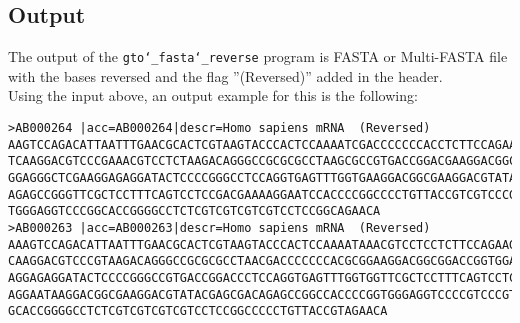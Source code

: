 \subsection*{Output}
The output of the \texttt{gto\char`_fasta\char`_reverse} program is FASTA or Multi-FASTA file with the bases reversed and the flag ''(Reversed)'' added in the header.\\
Using the input above, an output example for this is the following:
\begin{lstlisting}
>AB000264 |acc=AB000264|descr=Homo sapiens mRNA  (Reversed)
AAGTCCAGACATTAATTTGAACGCACTCGTAAGTACCCACTCCAAAATCGACCCCCCCACCTCTTCCAGAAGGTCTTCT
TCAAGGACGTCCCGAAACGTCCTCTAAGACAGGGCCGCGCGCCTAAGCGCCGTGACCGGACGAAGGACGGCGGACCGGT
GGAGGGCTCGAAGGAGAGGATACTCCCCGGGCCTCCAGGTGAGTTTGGTGAAGGACGGCGAAGGACGTATACGAGCGAC
AGAGCCGGGTTCGCTCCTTTCAGTCCTCCGACGAAAAGGAATCCACCCCGGCCCCTGTTACCGTCGTCCCGTCGCCACC
TGGGAGGTCCCGGCACCGGGGCCTCTCGTCGTCGTCGTCCTCCGGCAGAACA
>AB000263 |acc=AB000263|descr=Homo sapiens mRNA  (Reversed)
AAAGTCCAGACATTAATTTGAACGCACTCGTAAGTACCCACTCCAAAATAAACGTCCTCCTCTTCCAGAAGGTCTTCTT
CAAGGACGTCCCGTAAGACAGGGCCGCGCGCCTAACGACCCCCCCACGCGGAAGGACGGCGGACCGGTGGAGGGCTCGA
AGGAGAGGATACTCCCCGGGCCGTGACCGGACCCTCCAGGTGAGTTTGGTGGTTCGCTCCTTTCAGTCCTCCGACGAAA
AGGAATAAGGACGGCGAAGGACGTATACGAGCGACAGAGCCGGCCACCCCGGTGGGAGGTCCCCGTCCCGTCGCCACCG
GCACCGGGGCCTCTCGTCGTCGTCGTCCTCCGGCCCCCTGTTACCGTAGAACA
\end{lstlisting}